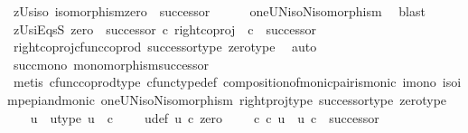 \begin{isabellebody}
\ zUs{\isacharunderscore}{\kern0pt}iso{\isacharcolon}{\kern0pt}\ {\isachardoublequoteopen}isomorphism{\isacharparenleft}{\kern0pt}zero\ {\isasymamalg}\ successor{\isacharparenright}{\kern0pt}{\isachardoublequoteclose}\isanewline
\ \ \ \ \isamarkupfalse%
\ oneUN{\isacharunderscore}{\kern0pt}iso{\isacharunderscore}{\kern0pt}N{\isacharunderscore}{\kern0pt}isomorphism\ \isamarkupfalse%
\ blast\isanewline
\ \ \isamarkupfalse%
\ zUsi{}EqsS{\isacharcolon}{\kern0pt}\ {\isachardoublequoteopen}{\isacharparenleft}{\kern0pt}zero\ {\isasymamalg}\ successor{\isacharparenright}{\kern0pt}\ {\isasymcirc}\isactrlsub c\ {\isacharparenleft}{\kern0pt}right{\isacharunderscore}{\kern0pt}coproj\ {\isasymone}\ {\isasymnat}\isactrlsub c{\isacharparenright}{\kern0pt}\ {\isacharequal}{\kern0pt}\ successor{\isachardoublequoteclose}\isanewline
\ \ \ \ \isamarkupfalse%
\ right{\isacharunderscore}{\kern0pt}coproj{\isacharunderscore}{\kern0pt}cfunc{\isacharunderscore}{\kern0pt}coprod\ successor{\isacharunderscore}{\kern0pt}type\ zero{\isacharunderscore}{\kern0pt}type\ \isamarkupfalse%
\ auto\isanewline
\ \ \isamarkupfalse%
\ \isamarkupfalse%
\ succ{\isacharunderscore}{\kern0pt}mono{\isacharcolon}{\kern0pt}\ {\isachardoublequoteopen}monomorphism{\isacharparenleft}{\kern0pt}successor{\isacharparenright}{\kern0pt}{\isachardoublequoteclose}\isanewline
\ \ \ \ \isamarkupfalse%
\ {\isacharparenleft}{\kern0pt}metis\ cfunc{\isacharunderscore}{\kern0pt}coprod{\isacharunderscore}{\kern0pt}type\ cfunc{\isacharunderscore}{\kern0pt}type{\isacharunderscore}{\kern0pt}def\ composition{\isacharunderscore}{\kern0pt}of{\isacharunderscore}{\kern0pt}monic{\isacharunderscore}{\kern0pt}pair{\isacharunderscore}{\kern0pt}is{\isacharunderscore}{\kern0pt}monic\ i{}{\isacharunderscore}{\kern0pt}mono\ iso{\isacharunderscore}{\kern0pt}imp{\isacharunderscore}{\kern0pt}epi{\isacharunderscore}{\kern0pt}and{\isacharunderscore}{\kern0pt}monic\ oneUN{\isacharunderscore}{\kern0pt}iso{\isacharunderscore}{\kern0pt}N{\isacharunderscore}{\kern0pt}isomorphism\ right{\isacharunderscore}{\kern0pt}proj{\isacharunderscore}{\kern0pt}type\ successor{\isacharunderscore}{\kern0pt}type\ zero{\isacharunderscore}{\kern0pt}type{\isacharparenright}{\kern0pt}\isanewline
\ \ \isamarkupfalse%
\ u\ \ u{\isacharunderscore}{\kern0pt}type{\isacharcolon}{\kern0pt}\ {\isachardoublequoteopen}u{\isacharcolon}{\kern0pt}\ \ {\isasymnat}\isactrlsub c\ \ {\isasymrightarrow}\ {\isasymOmega}{\isachardoublequoteclose}\ \ u{\isacharunderscore}{\kern0pt}def{\isacharcolon}{\kern0pt}\ {\isachardoublequoteopen}u\ {\isasymcirc}\isactrlsub c\ zero\ {\isacharequal}{\kern0pt}\ {\isasymt}\ \ {\isasymand}\ {\isacharparenleft}{\kern0pt}{\isasymf}{\isasymcirc}\isactrlsub c{\isasymbeta}\isactrlbsub {\isasymOmega}\isactrlesub {\isacharparenright}{\kern0pt}\ {\isasymcirc}\isactrlsub c\ u\ {\isacharequal}{\kern0pt}\ u\ {\isasymcirc}\isactrlsub c\ \ successor{\isachardoublequoteclose}\isanewline

\end{isabellebody}
